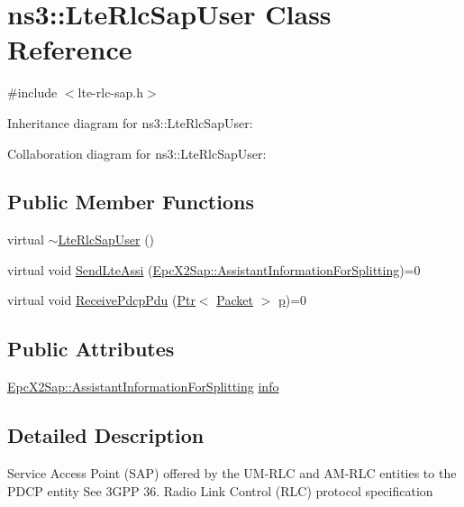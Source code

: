 \hypertarget{classns3_1_1LteRlcSapUser}{}\section{ns3\+:\+:Lte\+Rlc\+Sap\+User Class Reference}
\label{classns3_1_1LteRlcSapUser}


{\ttfamily \#include $<$lte-\/rlc-\/sap.\+h$>$}



Inheritance diagram for ns3\+:\+:Lte\+Rlc\+Sap\+User\+:


Collaboration diagram for ns3\+:\+:Lte\+Rlc\+Sap\+User\+:
\subsection*{Public Member Functions}
\begin{DoxyCompactItemize}
\item 
virtual \hyperlink{classns3_1_1LteRlcSapUser_a29f22fb5077bbc3f05ec449b3178552f}{$\sim$\+Lte\+Rlc\+Sap\+User} ()
\item 
virtual void \hyperlink{classns3_1_1LteRlcSapUser_a08d268f7a773c87325bffcf8e01031a5}{Send\+Lte\+Assi} (\hyperlink{structns3_1_1EpcX2Sap_1_1AssistantInformationForSplitting}{Epc\+X2\+Sap\+::\+Assistant\+Information\+For\+Splitting})=0
\item 
virtual void \hyperlink{classns3_1_1LteRlcSapUser_aaadbd52044f4bf26453b6eb2e26df9c8}{Receive\+Pdcp\+Pdu} (\hyperlink{classns3_1_1Ptr}{Ptr}$<$ \hyperlink{classns3_1_1Packet}{Packet} $>$ \hyperlink{lte__link__budget__x2__handover__measures_8m_ac9de518908a968428863f829398a4e62}{p})=0
\end{DoxyCompactItemize}
\subsection*{Public Attributes}
\begin{DoxyCompactItemize}
\item 
\hyperlink{structns3_1_1EpcX2Sap_1_1AssistantInformationForSplitting}{Epc\+X2\+Sap\+::\+Assistant\+Information\+For\+Splitting} \hyperlink{classns3_1_1LteRlcSapUser_ae5c93c1d5c538c4f8cec3ad4ecbd898a}{info}
\end{DoxyCompactItemize}


\subsection{Detailed Description}
Service Access Point (S\+AP) offered by the U\+M-\/\+R\+LC and A\+M-\/\+R\+LC entities to the P\+D\+CP entity See 3\+G\+PP 36. Radio Link Control (R\+LC) protocol specification

